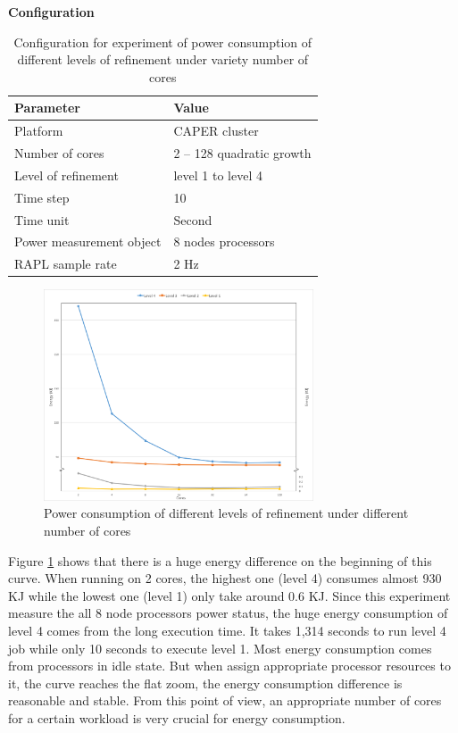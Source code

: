 \documentclass[10pt, conference, compsocconf]{IEEEtran}
\begin{document}
\noindent
\textbf{Configuration}
\begin{table}[H]
\begin{center}
\begin{tabular}{|l|l|}
	\hline
	\textbf{Parameter} & \textbf{Value}\\ \hline
    Platform & CAPER cluster\\ 		\hline
    Number of cores & 2 – 128 quadratic growth\\
	\hline
    Level of refinement  & level 1 to level 4\\
    \hline
    Time step & 10\\
    \hline
    Time unit & Second\\
    \hline
    Power measurement object & 8 nodes processors\\
    \hline
    RAPL sample rate & 2 Hz\\
    \hline
\end{tabular}
\end{center}
\caption{Configuration for experiment of power consumption of different levels of refinement under variety number of cores
}
\label{table:table_power_refinement}
\end{table}

\noindent
\begin{figure}[H]
	\centering
    \includegraphics[width=8cm]{figs/CAPER_lev1-4_power_edited.jpg}
        \caption{Power consumption of different levels of refinement under different number of cores }
        \label{fig:powerconsumptioncaper}
\end{figure}

\noindent

Figure \ref{fig:powerconsumptioncaper} shows that there is a huge energy difference on the beginning of this curve. When running on 2 cores, the highest one (level 4) consumes almost 930 KJ while the lowest one (level 1) only take around 0.6 KJ. Since this experiment measure the all 8 node processors power status, the huge energy consumption of level 4 comes from the long execution time. It takes 1,314 seconds to run level 4 job while only 10 seconds to execute level 1. Most energy consumption comes from processors in idle state. But when assign appropriate processor resources to it, the curve reaches the flat zoom, the energy consumption difference is reasonable and stable. From this point of view, an appropriate number of cores for a certain workload is very crucial for energy consumption.
\end{document}

